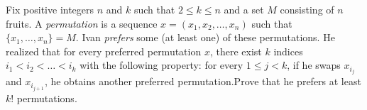 \documentclass{article}
\begin{document}
\setlength{\parindent}{0pt}
Fix positive integers \(\displaystyle n\) and \(\displaystyle k\) such that \(\displaystyle 2\leq k\leq n\) and a set \(\displaystyle M\) consisting of \(\displaystyle n\) fruits. A \emph{permutation} is a sequence \(\displaystyle x=(x_1,x_2,\ldots,x_n)\) such that \(\displaystyle \{x_1,\ldots,x_n\}=M\). Ivan \emph{prefers} some (at least one) of these permutations. He realized that for every preferred permutation \(\displaystyle x\), there exist \(\displaystyle k\) indices \(\displaystyle i_1<i_2<\ldots<i_k\) with the following property: for every \(\displaystyle1\le j<k\), if he swaps \(\displaystyle x_{i_j}\) and \(\displaystyle x_{i_{j+1}}\), he obtains another preferred permutation.\newline Prove that he prefers at least \(\displaystyle k!\) permutations.
\end{document}
